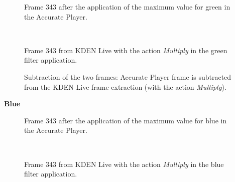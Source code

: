 \documentclass[../MasterThesis.tex]{subfiles}
\begin{document}
\begin{minipage}{0.48\textwidth}
	\begin{figure}[H]
		\begin{center}
			\caption[]{Frame 343 after the application of the maximum value for green in the Accurate Player.}
		\end{center}
	\end{figure}
\end{minipage}\begin{minipage}{0.04\textwidth}
	\ 
\end{minipage}\begin{minipage}{0.48\textwidth}
	\begin{figure}[H]
		\begin{center}
			\caption[]{Frame 343 from KDEN Live with the action \textit{Multiply} in the green filter application.}
		\end{center}
	\end{figure}
\end{minipage}

\vspace*{-1em}

\begin{figure}[H]
	\begin{center}
		\caption[]{Subtraction of the two frames: Accurate Player frame is subtracted from the KDEN Live frame extraction (with the action \textit{Multiply}).}
	\end{center}
\end{figure}


\vspace*{-1em}

\textbf{Blue}

\vspace*{-1em}


\begin{minipage}{0.48\textwidth}
	\begin{figure}[H]
		\begin{center}
			\caption[]{Frame 343 after the application of the maximum value for blue in the Accurate Player.}
		\end{center}
	\end{figure}
\end{minipage}\begin{minipage}{0.04\textwidth}
	\ 
\end{minipage}\begin{minipage}{0.48\textwidth}
	\begin{figure}[H]
		\begin{center}
			\caption[]{Frame 343 from KDEN Live with the action \textit{Multiply} in the blue filter application.}
		\end{center}
	\end{figure}
\end{minipage}
\end{document}
